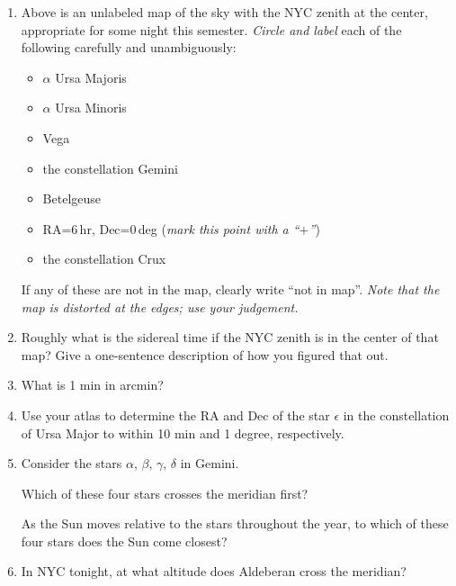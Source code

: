 \documentclass[12pt]{article}
\begin{document}
\begin{enumerate}

\item
Above is an unlabeled map of the sky with the NYC zenith at the
center, appropriate for some night this semester.  \emph{Circle and
label} each of the following carefully and unambiguously:
\begin{itemize}
\item $\alpha$ Ursa Majoris
\item $\alpha$ Ursa Minoris
\item Vega
\item the constellation Gemini
\item Betelgeuse
\item RA=6\,hr, Dec=0\,deg (\emph{mark this point with a ``$+$''})
\item the constellation Crux
\end{itemize}
If any of these are not in the map, clearly write ``not in map''.
\emph{Note that the map is distorted at the edges; use your
judgement.}

\item
Roughly what is the sidereal time if the NYC zenith is in the center
of that map?  Give a one-sentence description of how you figured that
out.

\vspace{1in}

\item 
What is 1 min in arcmin?

\vspace{0.5in}

\item 
Use your atlas to determine the RA and Dec of the star $\epsilon$ in
the constellation of Ursa Major to within 10 min and 1 degree,
respectively.

\vspace{0.5in}

\item
Consider the stars $\alpha$, $\beta$, $\gamma$, $\delta$ in Gemini.

Which of these four stars crosses the meridian first?

\vspace{0.5in}

As the Sun moves relative to the stars throughout the year, to which
of these four stars does the Sun come closest?

\vspace{0.5in}

\item 
In NYC tonight, at what altitude does Aldeberan cross the meridian?


\end{enumerate}
\end{document}
